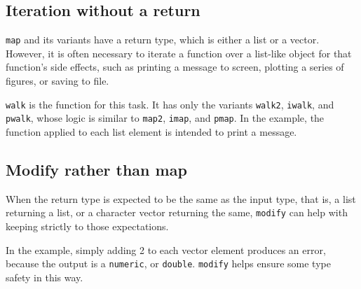 \documentclass[]{book}
\newenvironment{Shaded}{}{}
\newcommand{\ControlFlowTok}[1]{\textcolor[rgb]{0.00,0.44,0.13}{\textbf{#1}}}
\newcommand{\KeywordTok}[1]{\textcolor[rgb]{0.00,0.44,0.13}{\textbf{#1}}}
\newcommand{\NormalTok}[1]{#1}
\newcommand{\OperatorTok}[1]{\textcolor[rgb]{0.40,0.40,0.40}{#1}}
\newcommand{\StringTok}[1]{\textcolor[rgb]{0.25,0.44,0.63}{#1}}
\begin{document}
\hypertarget{iteration-without-a-return}{%
\subsection{Iteration without a return}\label{iteration-without-a-return}}

\texttt{map} and its variants have a return type, which is either a list or a vector.
However, it is often necessary to iterate a function over a list-like object for that function's side effects, such as printing a message to screen, plotting a series of figures, or saving to file.

\texttt{walk} is the function for this task. It has only the variants \texttt{walk2}, \texttt{iwalk}, and \texttt{pwalk}, whose logic is similar to \texttt{map2}, \texttt{imap}, and \texttt{pmap}. In the example, the function applied to each list element is intended to print a message.

\begin{Shaded}
\end{Shaded}

\hypertarget{modify-rather-than-map}{%
\subsection{Modify rather than map}\label{modify-rather-than-map}}

When the return type is expected to be the same as the input type, that is, a list returning a list, or a character vector returning the same, \texttt{modify} can help with keeping strictly to those expectations.

In the example, simply adding 2 to each vector element produces an error, because the output is a \texttt{numeric}, or \texttt{double}. \texttt{modify} helps ensure some type safety in this way.
\end{document}
